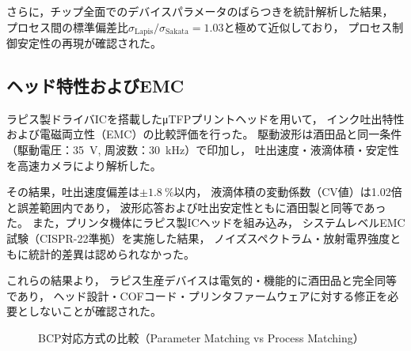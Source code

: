 \documentclass[conference]{IEEEtran}
\begin{document}
さらに，チップ全面でのデバイスパラメータのばらつきを統計解析した結果，
プロセス間の標準偏差比$\sigma_{\mathrm{Lapis}} / \sigma_{\mathrm{Sakata}} = 1.03$と極めて近似しており，
プロセス制御安定性の再現が確認された。

\subsection{ヘッド特性およびEMC}
ラピス製ドライバICを搭載したμTFPプリントヘッドを用いて，
インク吐出特性および電磁両立性（EMC）の比較評価を行った。
駆動波形は酒田品と同一条件（駆動電圧：\SI{35}{\volt}, 周波数：\SI{30}{\kilo\hertz}）で印加し，
吐出速度・液滴体積・安定性を高速カメラにより解析した。

その結果，吐出速度偏差は$\pm\SI{1.8}{\percent}$以内，
液滴体積の変動係数（CV値）は1.02倍と誤差範囲内であり，
波形応答および吐出安定性ともに酒田製と同等であった。
また，プリンタ機体にラピス製ICヘッドを組み込み，
システムレベルEMC試験（CISPR-22準拠）を実施した結果，
ノイズスペクトラム・放射電界強度ともに統計的差異は認められなかった。

これらの結果より，
ラピス生産デバイスは電気的・機能的に酒田品と完全同等であり，
ヘッド設計・COFコード・プリンタファームウェアに対する修正を必要としないことが確認された。

\begin{figure}[t]
\centering
{}
\caption{BCP対応方式の比較（Parameter Matching vs Process Matching）}
\label{fig:bcp_compare}
\end{figure}
\end{document}
